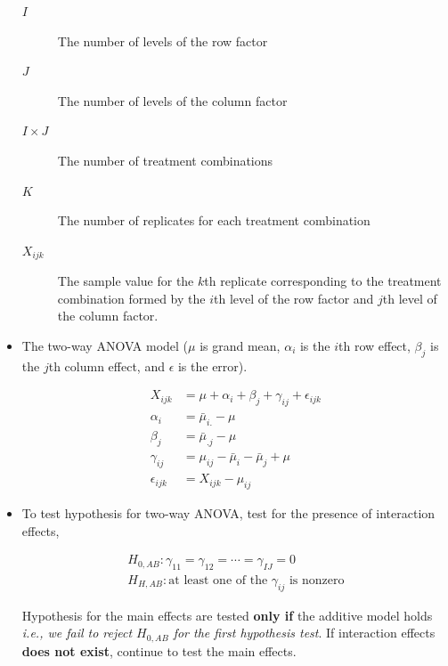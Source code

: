 \documentclass[9pt,landscape]{memoir}
\begin{document}
\begin{multicols}{3}
\begin{itemize}
            \begin{description}
                \item[$I$] The number of levels of the row factor
                \item[$J$] The number of levels of the column factor
                \item[$I\times J$] The number of treatment combinations
                \item[$K$] The number of replicates for each treatment combination
                \item[$X_{ijk}$] The sample value for the $k$th replicate corresponding to the treatment combination formed by the $i$th level of the row factor and $j$th level of the column factor.
            \end{description}

        \item The two-way ANOVA model ($\mu$ is grand mean, $\alpha_i$ is the $i$th row effect, $\beta_j$ is the $j$th column effect, and $\epsilon$ is the error).

            \begin{align*}
                X_{ijk}        &= \mu + \alpha_i + \beta_j + \gamma_{ij} + \epsilon_{ijk} \\
                \alpha_i       &= \bar{\mu}_{i.} - \mu \\
                \beta_j        &= \bar{\mu}_{.j} - \mu \\
                \gamma_{ij}    &= \mu_{ij} - \bar{\mu}_i - \bar{\mu}_j + \mu \\
                \epsilon_{ijk} &= X_{ijk} - \mu_{ij}
            \end{align*}

        \item To test hypothesis for two-way ANOVA, test for the presence of interaction effects,

            \begin{align*}
                H_{0, AB}: \gamma_{11} = \gamma_{12} = \cdots = \gamma_{IJ} = 0 \\
                H_{H, AB}: \text{at least one of the $\gamma_{ij}$ is nonzero}
            \end{align*}

            Hypothesis for the main effects are tested \textbf{only if} the additive model holds \textit{i.e., we fail to reject $H_{0, AB}$ for the first hypothesis test}. If interaction effects \textbf{does not exist}, continue to test the main effects.


\end{itemize}
\end{multicols}
\end{document}
